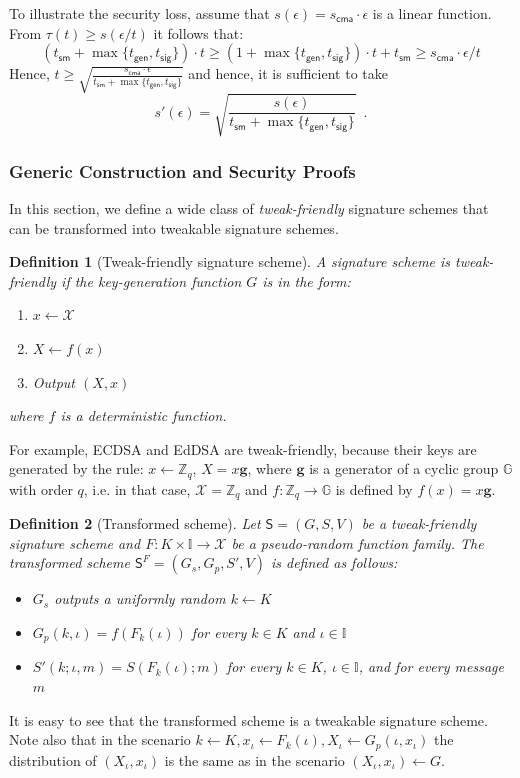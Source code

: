 \documentclass{article}
\newtheorem{definition}{Definition}[section]
\begin{document}
\medskip\medskip
\noindent To illustrate the security loss, assume that $s(\epsilon)=s_\mathsf{cma}\cdot \epsilon$ is a linear function. From $\tau(t)\ge s(\epsilon/t)$ it follows that:
\[
(t_\mathsf{sm}+\max\{t_\mathsf{gen},t_\mathsf{sig}\})\cdot t \ge
(1+\max\{t_\mathsf{gen},t_\mathsf{sig}\})\cdot t + t_\mathsf{sm} \ge s_\mathsf{cma}\cdot \epsilon/t
\]
Hence, $t\ge \sqrt{\frac{s_\mathsf{cma}\cdot \epsilon}{t_\mathsf{sm}+\max\{t_\mathsf{gen},t_\mathsf{sig}\}}}$ and hence, it is sufficient to take \[s'(\epsilon)=\sqrt{\frac{s(\epsilon)}{t_\mathsf{sm}+\max\{t_\mathsf{gen},t_\mathsf{sig}\}}}\enspace.
\]

\subsubsection{Generic Construction and Security Proofs}

In this section, we define a wide class of \emph{tweak-friendly} signature schemes that can be transformed into tweakable signature schemes.

\begin{definition}[Tweak-friendly signature scheme]
A signature scheme is tweak-friendly if the key-generation function $G$ is in the form:
\begin{enumerate}
\item $x\gets \mathcal{X}$
\item $X\gets f(x)$
\item Output $(X,x)$
\end{enumerate}
where $f$ is a deterministic function.
\end{definition}
For example, ECDSA and EdDSA are tweak-friendly, because their keys are generated by the rule: $x\gets \mathbb{Z}_q$, $X=x\mathbf{g}$, where $\mathbf{g}$ is a generator of a cyclic group $\mathbb{G}$ with order $q$, i.e. in that case, $\mathcal{X}=\mathbb{Z}_q$ and $f\colon \mathbb{Z}_q\rightarrow \mathbb{G}$ is defined by  $f(x)=x\mathbf{g}$.


\begin{definition}[Transformed scheme]
Let $\mathsf{S}=(G,S,V)$ be a tweak-friendly signature scheme and $F\colon K\times \mathbb{I} \rightarrow \mathcal{X}$ be a pseudo-random function family.
The transformed scheme $\mathsf{S}^F=(G_s,G_p,S',V)$ is defined as follows:
\begin{itemize}
\item $G_s$ outputs a uniformly random $k\gets K$
\item $G_p(k,\iota)=f(F_k(\iota))$ for every $k\in K$ and $\iota\in \mathbb{I}$
\item $S'(k;\iota,m)=S(F_k(\iota); m)$ for every $k\in K$, $\iota\in \mathbb{I}$, and for every message $m$
\end{itemize}
\end{definition}
It is easy to see that the transformed scheme is a tweakable signature scheme. Note also that in the scenario $k \gets K, x_\iota \gets F_k(\iota), X_\iota\gets G_p(\iota, x_\iota)$
the distribution of $(X_\iota,x_\iota)$ is the same as in the scenario
$(X_\iota,x_\iota)\gets G$.
\end{document}
